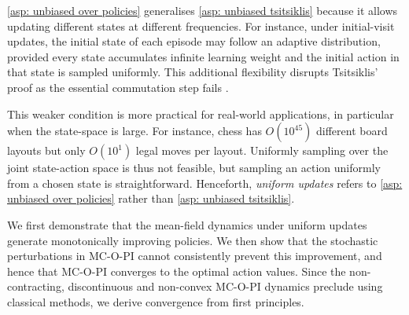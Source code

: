 \autoref{asp: unbiased over policies} generalises \autoref{asp: unbiased tsitsiklis} because it allows updating different states at different frequencies.
For instance, under initial-visit updates, the initial state of each episode may follow an adaptive distribution, provided every state accumulates infinite learning weight and the initial action in that state is sampled uniformly.
This additional flexibility disrupts Tsitsiklis' proof as the essential commutation step fails \citep[p.~64]{Tsitsiklis2002OnIteration}.

This weaker condition is more practical for real-world applications, in particular when the state-space is large.
For instance, chess has $O(10^{45})$ different board layouts but only $O (10^1)$ legal moves per layout.
Uniformly sampling over the joint state-action space is thus not feasible, but sampling an action uniformly from a chosen state is straightforward.
Henceforth, \textit{uniform updates} refers to \autoref{asp: unbiased over policies} rather than \autoref{asp: unbiased tsitsiklis}.


We first demonstrate that the mean-field dynamics under uniform updates generate monotonically improving policies.
We then show that the stochastic perturbations in MC-O-PI cannot consistently prevent this improvement, and hence that MC-O-PI converges to the optimal action values.
Since the non-contracting, discontinuous and non-convex MC-O-PI dynamics preclude using classical methods, we derive convergence from first principles.






